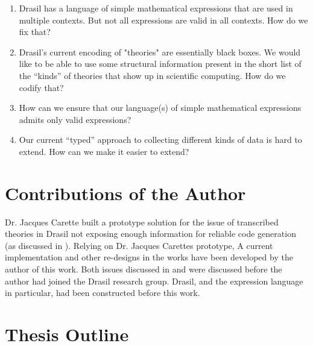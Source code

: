 \begin{enumerate}

      \item[\namedlabel{rq:one}{RQ1}] Drasil has a language of simple
            mathematical expressions that are used in multiple contexts. But not
            all expressions are valid in all contexts. How do we fix that?

      \item[\namedlabel{rq:two}{RQ2}] Drasil's current encoding of "theories"
            are essentially black boxes. We would like to be able to use some
            structural information present in the short list of the ``kinds'' of
            theories that show up in scientific computing. How do we codify
            that?

      \item[\namedlabel{rq:three}{RQ3}] How can we ensure that our language(s)
            of simple mathematical expressions admits only valid expressions?

      \item[\namedlabel{rq:four}{RQ4}] Our current ``typed'' approach to
            collecting different kinds of data is hard to extend. How can we
            make it easier to extend?

\end{enumerate}

\section{Contributions of the Author}
\label{sec:intro:contributions}


Dr. Jacques Carette built a prototype solution for the
issue of transcribed theories in Drasil not exposing enough information
for reliable code generation (as discussed in ).
Relying on Dr. Jacques Carettes prototype, A current implementation and
other re-designs in the works have been developed by the author of this
work. Both issues discussed in  and
 were discussed before the author had joined the
Drasil research group. Drasil, and the expression language in particular,
had been constructed before this work.

\section{Thesis Outline}
\label{sec:intro:outline}


